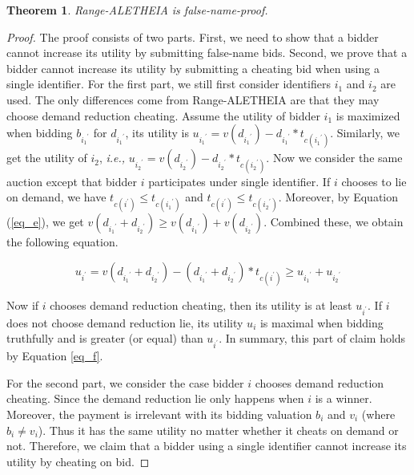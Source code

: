 \documentclass{sig-alternate}
\newtheorem{theorem}{Theorem}
\begin{document}
\begin{theorem}
\label{th_rangefp}
   Range-ALETHEIA is false-name-proof.
\end{theorem}
\begin{proof}
The proof consists of two parts. First, we need to show that a bidder cannot increase its utility by submitting false-name bids. Second, we prove that a bidder cannot increase its utility by submitting a cheating bid when using a single identifier. For the first part, we still first consider identifiers $i_1$ and $i_2$ are used. The only differences come from Range-ALETHEIA are that they may choose demand reduction cheating. Assume the utility of bidder $i_1$ is maximized when bidding $b_{{i_1}^{'}}$ for $d_{{i_1}^{'}}$, its utility is $u_{{i_1}^{'}} = v(d_{{i_1}^{'}})-d_{{i_1}^{'}}*t_{c({i_1}^{'})}$.  Similarly, we get the utility of $i_{2}$, \emph{i.e.,} $u_{{i_2}^{'}} = v(d_{{i_2}^{'}})-d_{{i_2}^{'}}*t_{c({i_2}^{'})}$. Now we consider the same auction except that bidder $i$ participates under single identifier. If $i$ chooses to lie on demand, we have $t_{c(i^{'})} \le t_{c({i_1}^{'})}$ and $t_{c(i^{'})} \le t_{c({i_2}^{'})}$. Moreover, by Equation (\ref{eq_e}), we get $v(d_{{i_1}^{'}}+d_{{i_2}^{'}}) \ge v(d_{{i_1}^{'}}) + v(d_{{i_2}^{'}})$. Combined these, we obtain the following equation.

\begin{equation}
\label{eq_f}
u_{i^{'}} = v(d_{{i_1}^{'}}+ d_{{i_2}^{'}}) - (d_{{i_1}^{'}}+d_{{i_2}^{'}})*t_{c(i^{'})} \ge u_{{i_1}^{'}} + u_{{i_2}^{'}}
\end{equation}

Now if $i$ chooses demand reduction cheating, then its utility is at least $u_{i^{'}}$. If $i$ does not choose demand reduction lie, its utility $u_i$ is maximal when bidding truthfully and is greater (or equal) than $u_{i^{'}}$. In summary, this part of claim holds by Equation \ref{eq_f}.

For the second part,
we consider the case bidder $i$ chooses demand reduction cheating. Since the demand reduction lie only happens when $i$ is a winner. Moreover, the payment is irrelevant with its bidding valuation $b_i$ and $v_i$ (where $b_i\neq v_i$). Thus it has the same utility no matter whether it cheats on demand or not. Therefore, we claim that a bidder using a single identifier cannot increase its utility by cheating on bid.
\end{proof}
\end{document}
